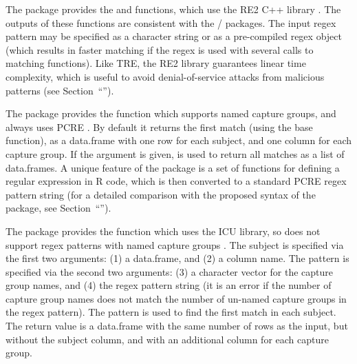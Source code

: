 The  package provides the  and
 functions, which use the RE2 C++ library
\citep{re2r}. The outputs of these functions are consistent with the
/ packages. The input regex pattern may be specified as
a character string or as a pre-compiled regex object (which
results in faster matching if the regex is used with several calls to
matching functions). Like TRE, the RE2 library guarantees linear
time complexity, which is useful to avoid denial-of-service attacks
from malicious patterns (see Section~``\sectiontimings'').

The  package provides the  function which supports
named capture groups, and always uses PCRE \citep{rex}. By default it
returns the first match (using the base  function), as a
data.frame with one row for each subject, and one column for each
capture group. If the  argument is given,
 is used to return all matches as a list of
data.frames. A unique feature of the  package is a set of functions
for defining a regular expression in R code, which is then converted
to a standard PCRE regex pattern string (for a detailed comparison
with the proposed syntax of the  package, see
Section~``\sectionrex'').

The  package provides the  function which uses the
ICU library, so does not support regex patterns with named capture
groups \citep{tidyr}. The subject is specified via the first two
arguments: (1) a data.frame, and (2) a column name. The pattern is
specified via the second two arguments: (3) a character vector for the
capture group names, and (4) the regex pattern string (it is an error
if the number of capture group names does not match the number of un-named
capture groups in the regex pattern). The pattern is used to find the
first match in each subject. The return value is a data.frame with the
same number of rows as the input, but without the subject column, and
with an additional column for each capture group.

